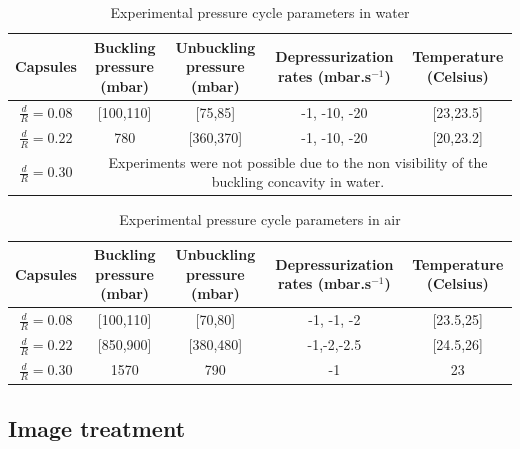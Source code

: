 \begin{table}[H]
	\centering
		\begin{adjustbox}{width=\textwidth}
			\begin{tabular}{|c|c|c|c|c|}
				\hline
				Capsules & Buckling pressure (mbar) & Unbuckling pressure (mbar) & Depressurization rates (mbar.s$^{-1}$) & Temperature (Celsius) \\
				\hline
				$\frac{d}{R} = 0.08 $ & [100,110]& [75,85] & -1, -10, -20 & [23,23.5]\\
				\hline
				$\frac{d}{R} = 0.22$ & 780 & [360,370] & -1, -10, -20 & [20,23.2]\\
				\hline
				$\frac{d}{R} = 0.30$ &  \multicolumn{4}{c|}{Experiments were not possible due to the non visibility of the buckling concavity in water.}\\
				\hline
			\end{tabular}
		\end{adjustbox}
	
	\caption{Experimental pressure cycle parameters in water}
	\label{tab:Experimental_pressure_cycle_parameters_in_water}
\end{table}

\begin{table}[H]
	\centering
		\begin{adjustbox}{width=\textwidth}
			\begin{tabular}{|c|c|c|c|c|}
				\hline
				Capsules & Buckling pressure (mbar) & Unbuckling pressure (mbar) & Depressurization rates (mbar.s$^{-1}$) & Temperature (Celsius) \\
				\hline
				$\frac{d}{R} = 0.08$ & [100,110]& [70,80] & -1, -1, -2 & [23.5,25]\\
				$\frac{d}{R} = 0.22$ & [850,900] & [380,480] & -1,-2,-2.5 & [24.5,26]\\
				$\frac{d}{R} = 0.30$ & 1570 & 790 & -1 & 23 \\
				\hline
			\end{tabular}
		\end{adjustbox}
	\caption{Experimental pressure cycle parameters in air}
	\label{tab:Experimental_pressure_cycle_parameters_in_air}
\end{table}







\subsection{Image treatment}
